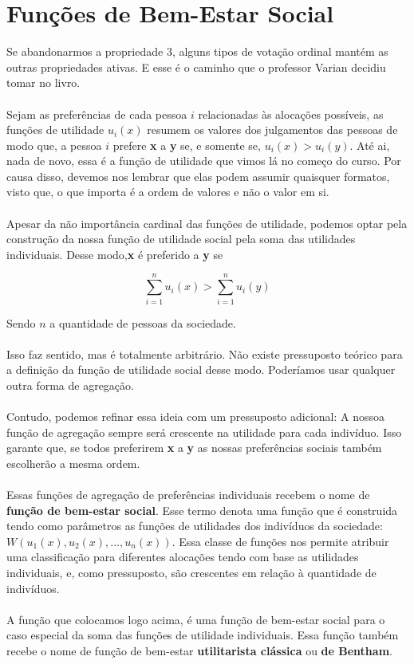 \documentclass[a4paper,11pt,oneside]{book}
\theoremstyle{definition}
\theoremstyle{break}
\begin{document}
\section{Funções de Bem-Estar Social}

Se abandonarmos a propriedade 3, alguns tipos de votação ordinal mantém as outras propriedades ativas. E esse é o caminho que o professor Varian decidiu tomar no livro.
\\
\\
Sejam as preferências de cada pessoa $i$ relacionadas às alocações possíveis, as funções de utilidade $u_i(x)$ resumem os valores dos julgamentos das pessoas de modo que, a pessoa $i$ prefere \textbf{x} a \textbf{y} se, e somente se, $u_i(x) > u_i(y)$. Até ai, nada de novo, essa é a função de utilidade que vimos lá no começo do curso. Por causa disso, devemos nos lembrar que elas podem assumir quaisquer formatos, visto que, o que importa é a ordem de valores e não o valor em si.
\\
\\
Apesar da não importância cardinal das funções de utilidade, podemos optar pela construção da nossa função de utilidade social pela soma das utilidades individuais. Desse modo,\textbf{x} é preferido a \textbf{y} se

$$  \displaystyle \sum^n_{i = 1} u_i(x) > \sum^n_{i = 1} u_i(y)$$

Sendo $n$ a quantidade de pessoas da sociedade.
\\
\\
Isso faz sentido, mas é totalmente arbitrário. Não existe pressuposto teórico para a definição da função de utilidade social desse modo. Poderíamos usar qualquer outra forma de agregação.
\\
\\
Contudo, podemos refinar essa ideia com um pressuposto adicional: A nossoa função de agregação sempre será crescente na utilidade para cada indivíduo. Isso garante que, se todos preferirem \textbf{x} a \textbf{y} as nossas preferências sociais também escolherão a mesma ordem.
\\
\\
Essas funções de agregação de preferências individuais recebem o nome de \textbf{função de bem-estar social}. Esse termo denota uma função que é construida tendo como parâmetros as funções de utilidades dos indivíduos da sociedade: $W(u_1(x),u_2(x),...,u_n(x))$. Essa classe de funções nos permite atribuir uma classificação para diferentes alocações tendo com base as utilidades individuais, e, como pressuposto, são crescentes em relação à quantidade de indivíduos.
\\
\\
A função que colocamos logo acima, é uma função de bem-estar social para o caso especial da soma das funções de utilidade individuais. Essa função também recebe o nome de  função de bem-estar \textbf{utilitarista clássica}
 ou \textbf{de Bentham}.
\end{document}

